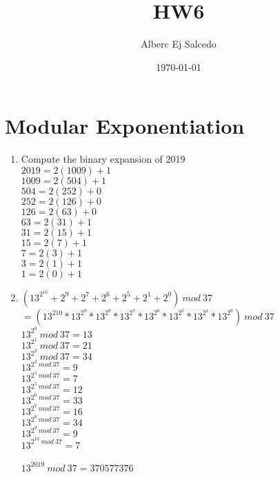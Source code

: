 \documentclass[11pt]{article}
\title{HW6}
\author{Alberc Ej Salcedo }
\date{\today}
\begin{document}
\maketitle

\section{Modular Exponentiation}

\begin{enumerate}
\item 
Compute the binary expansion of 2019\\
$2019 = 2(1009) + 1$\\
$1009 = 2(504) + 1$\\
$504 = 2(252) + 0$\\
$252 = 2(126) + 0$\\
$126 = 2(63) + 0$\\
$63 = 2(31) + 1$\\
$31 = 2(15) + 1$\\
$15 = 2(7) + 1$\\
$7 = 2(3) + 1$\\
$3 = 2(1) + 1$\\
$1 = 2(0) + 1$\\
\item
$(13^{2^{16}} + 2^{9} + 2^{7} + 2^{6} + 2^{5} + 2^{1} +  2^{0})~mod~37$\\
$= (13^{2{10}} * 13^{2^{9}} * 13^{2^{8}} * 13^{2^{7}} * 13^{2^{6}} * 13^{2^{5}} * 13^{2^{1}} * 13^{2^{0}})~mod~37$\\
$13^{2^{0}}~mod~37 = 13$\\
$13^{2^{1}}~mod~37 = 21$\\
$13^{2^{2}}~mod~37 = 34$\\
$13^{2^{3}~mod~37} = 9$\\
$13^{2^{4}~mod~37} = 7$\\
$13^{2^{5}~mod~37} = 12$\\
$13^{2^{6}~mod~37} = 33$\\
$13^{2^{7}~mod~37} = 16$\\
$13^{2^{8}~mod~37} = 34$\\
$13^{2^{9}~mod~37} = 9$\\
$13^{2^{10}~mod~37} = 7$\\
\\
$13^{2019}~mod~37 = 370577376$
\end{enumerate}
\end{document}
